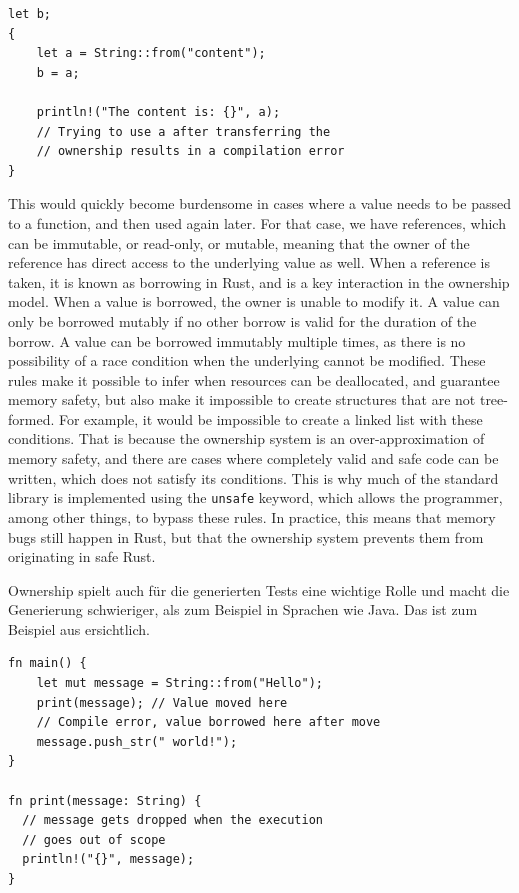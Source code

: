 \documentclass[paper=a4,%
  twoside,%
  BCOR4mm,%
  abstract=true,%
  toc=bibliography,%
  chapterprefix=true,%
  toc=bibliographynumbered,%
  open=right,%
  english,%
  pagesize=pdftex]{scrreprt}
\begin{document}
\begin{lstlisting}[style=boxed, caption=Transferring Ownership, label=lst:transfer-ownership]
let b;
{
    let a = String::from("content");
    b = a;

    println!("The content is: {}", a);
    // Trying to use a after transferring the
    // ownership results in a compilation error
}
\end{lstlisting}

This would quickly become burdensome in cases where a value needs to be passed to a function, and then used again later. For that case, we have references, which can be immutable, or read-only, or mutable, meaning that the owner of the reference has direct access to the underlying value as well. When a reference is taken, it is known as borrowing in Rust, and is a key interaction in the ownership model. When a value is borrowed, the owner is unable to modify it. A value can only be borrowed mutably if no other borrow is valid for the duration of the borrow. A value can be borrowed immutably multiple times, as there is no possibility of a race condition when the underlying cannot be modified. These rules make it possible to infer when resources can be deallocated, and guarantee memory safety, but also make it impossible to create structures that are not tree-formed. For example, it would be impossible to create a linked list with these conditions. That is because the ownership system is an over-approximation of memory safety, and there are cases where completely valid and safe code can be written, which does not satisfy its conditions. This is why much of the standard library is implemented using the \texttt{unsafe} keyword, which allows the programmer, among other things, to bypass these rules. In practice, this means that memory bugs still happen in Rust, but that the ownership system prevents them from originating in safe Rust.

Ownership spielt auch für die generierten Tests eine wichtige Rolle und macht die Generierung schwieriger, als zum Beispiel in Sprachen wie Java. Das ist zum Beispiel aus  ersichtlich.
\begin{lstlisting}[style=boxed, caption={Transferring the ownership to a method}, label=lst:ownership-method-call]
fn main() {
    let mut message = String::from("Hello");
    print(message); // Value moved here
    // Compile error, value borrowed here after move
    message.push_str(" world!");
}

fn print(message: String) {
  // message gets dropped when the execution
  // goes out of scope
  println!("{}", message);
}
\end{lstlisting}
\end{document}
